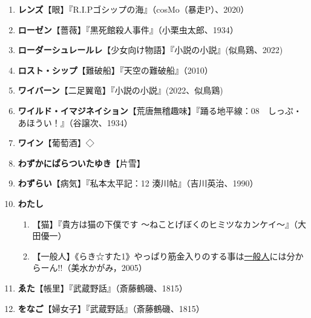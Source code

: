 \documentclass[twocolumn]{jsbook}
\newcommand{\ccite}[1]{《#1》}
\begin{document}
\begin{enumerate}
    \item \textbf{レンズ}【眼】『R.I.Pゴシップの海』（cosMo（暴走P）、2020）
    \item \textbf{ローゼン}【薔薇】『黒死館殺人事件』（小栗虫太郎、1934）
    \item \textbf{ローダーシュレールレ}【少女向け物語】『小説の小説』(似鳥鶏、2022)
    \item \textbf{ロスト・シップ}【難破船】『天空の難破船』（2010）
    \item \textbf{ワイバーン}【二足翼竜】『小説の小説』(2022、似鳥鶏)
    \item \textbf{ワイルド・イマジネイション}【荒唐無稽趣味】『踊る地平線：08　しっぷ・あほうい！』（谷譲次、1934）
    \item \textbf{ワイン}【葡萄酒】◇
    \item \textbf{わずかにぱらついたゆき}【片雪】
    \item \textbf{わずらい}【病気】『私本太平記：12 湊川帖』（吉川英治、1990）
    \item \textbf{わたし}
    \begin{enumerate}[label= \raise0.2ex\hbox{\textcircled{\scriptsize{\arabic*}}}]
        \item 【猫】『貴方は猫の下僕です ～ねことげぼくのヒミツなカンケイ～』（大田優一）
        \item 【一般人】\ccite{らき☆すた1}{やっぱり筋金入りのする事は\uline{一般人}には分からーん!!（美水かがみ，2005）}
    \end{enumerate}
    \item \textbf{ゑた}【帳里】『武蔵野話』（斎藤鶴磯、1815）
    \item \textbf{をなご}【婦女子】『武蔵野話』（斎藤鶴磯、1815）
\end{enumerate}
\end{document}
